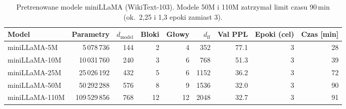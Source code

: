 \begin{table}[H]
\centering
\small
\caption{Pretrenowane modele miniLLaMA (WikiText-103). Modele 50M i 110M zatrzymał limit czasu 90\,min (ok.\ 2{,}25 i 1{,}3 epoki zamiast 3).}
\label{tab:pretrain}
\begin{tabular}{@{}lrrrrrrrr@{}}
\toprule
Model & Parametry & $d_\text{model}$ & Bloki & Głowy & $d_\text{ff}$ & Val PPL & Epoki (cel) & Czas [min] \\
\midrule
miniLLaMA-5M & 5\,078\,736 & 144 & 2 & 4 & 352 & 77.1 & 3 & 28 \\
miniLLaMA-10M & 10\,031\,760 & 240 & 3 & 6 & 768 & 51.3 & 3 & 39 \\
miniLLaMA-25M & 25\,026\,192 & 432 & 5 & 6 & 1152 & 36.2 & 3 & 72 \\
miniLLaMA-50M & 50\,292\,288 & 576 & 8 & 9 & 1536 & 32.0 & 3 & 90 \\
miniLLaMA-110M & 109\,529\,856 & 768 & 12 & 12 & 2048 & 32.7 & 3 & 91 \\
\bottomrule
\end{tabular}
\end{table}
